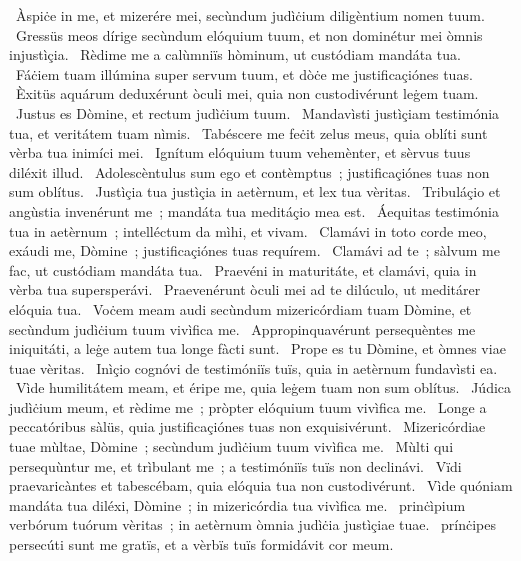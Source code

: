 \psalmBeginDivision
{%
~Àspiċe in me, et mizerére mei, secùndum judìċium diligèntium nomen tuum.
~Gressüs meos dírige secùndum elóquium tuum, et non dominétur mei òmnis injustìçia.
~Rèdime me a calùmniïs hòminum, ut custódiam mandáta tua.
~Fáċiem tuam illúmina super servum tuum, et dòċe me justificaçiónes tuas.
~Èxitüs aquárum deduxérunt òculi mei, quia non custodivérunt leġem tuam.
~Justus es Dòmine, et rectum judìċium tuum.
~Mandavìsti justìçiam testimónia tua, et veritátem tuam nìmis.
~Tabéscere me feċit zelus meus, quia oblíti sunt vèrba tua inimíci mei.
~Ignítum elóquium tuum vehemènter, et sèrvus tuus diléxit illud.
~Adolescèntulus sum ego et contèmptus~; justificaçiónes tuas non sum oblítus.
~Justìçia tua justìçia in aetèrnum, et lex tua vèritas.
~Tribuláçio et angùstia invenérunt me~; mandáta tua meditáçio mea est.
~Áequitas testimónia tua in aetèrnum~; intelléctum da mìhi, et vivam.
~Clamávi in toto corde meo, exáudi me, Dòmine~; justificaçiónes tuas requírem.
~Clamávi ad te~; sàlvum me fac, ut custódiam mandáta tua.
~Praevéni in maturitáte, et clamávi, quia in vèrba tua supersperávi.
~Praevenérunt òculi mei ad te dilúculo, ut meditárer elóquia tua.
~Voċem meam audi secùndum mizericórdiam tuam Dòmine, et secùndum judìċium tuum vivìfica me.
~Appropinquavérunt persequèntes me iniquitáti, a leġe autem tua longe fàcti sunt.
~Prope es tu Dòmine, et òmnes viae tuae vèritas.
~Inìçio cognóvi de testimóniïs tuïs, quia in aetèrnum fundavìsti ea.
~Vìde humilitátem meam, et éripe me, quia leġem tuam non sum oblítus.
~Júdica judìċium meum, et rèdime me~; pròpter elóquium tuum vivìfica me.
~Longe a peccatóribus sàlüs, quia justificaçiónes tuas non exquisivérunt.
~Mizericórdiae tuae mùltae, Dòmine~; secùndum judìċium tuum vivìfica me.
~Mùlti qui persequùntur me, et trìbulant me~; a testimóniïs tuïs non declinávi.
~Vïdi praevaricàntes et tabescébam, quia elóquia tua non custodivérunt.
~Vìde quóniam mandáta tua diléxi, Dòmine~; in mizericórdia tua vivìfica me.
~prinċìpium verbórum tuórum vèritas~; in aetèrnum òmnia judìċia justìçiae tuae.
~prínċipes persecúti sunt me gratïs, et a vèrbïs tuïs formidávit cor meum.
}
